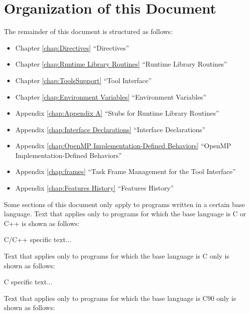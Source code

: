 \pagebreak
\section{Organization of this Document}
\label{sec:Organization of this document}
The remainder of this document is structured as follows: 

\begin{itemize}
\item Chapter \ref{chap:Directives} ``Directives''

\item Chapter \ref{chap:Runtime Library Routines} ``Runtime Library Routines''

\item Chapter \ref{chap:ToolsSupport} ``Tool Interface''

\item Chapter \ref{chap:Environment Variables} ``Environment Variables''

\item Appendix \ref{chap:Appendix A} ``Stubs for Runtime Library Routines''

\item Appendix \ref{chap:Interface Declarations} ``Interface Declarations'' 

\item Appendix \ref{chap:OpenMP Implementation-Defined Behaviors} ``OpenMP Implementation-Defined Behaviors''

\item Appendix \ref{chap:frames} ``Task Frame Management for the Tool Interface''

\item Appendix \ref{chap:Features History} ``Features History''
\end{itemize}

Some sections of this document only apply to programs written in a certain base 
language. Text that applies only to programs for which the base language is C or C++ is shown 
as follows: 

\begin{ccppspecific}
C/C++ specific text...
\end{ccppspecific}

Text that applies only to programs for which the base language is C only is shown as follows:

\begin{cspecific}
C specific text...
\end{cspecific}

Text that applies only to programs for which the base language is C90 only is shown as 
follows:

